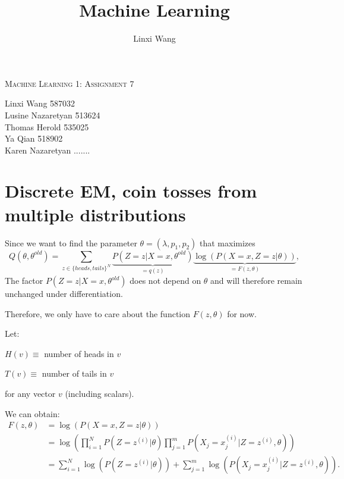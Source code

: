 \documentclass[10pt,a4paper]{article}
\author{Linxi Wang}
\title{Machine Learning}
\begin{document}
\begin{center}
\Large{\textsc{Machine Learning 1: Assignment 7}} \\
\end{center}

\begin{tabbing}
Linxi Wang \hspace{0.9cm}\= 587032\\
Lusine Nazaretyan \hspace{0.9cm}\= 513624\\
Thomas Herold \hspace{0.9cm}\= 535025\\ 
Ya Qian \hspace{0.9cm}\= 518902\\ 
Karen Nazaretyan\>  .......
\end{tabbing}


\section{Discrete EM, coin tosses from multiple distributions}

Since we want to find the parameter $\theta=(\lambda,p_1,p_2)$ that maximizes \begin{equation*}
Q(\theta,\theta^{old})=\sum_{z\in \{heads,tails\}^N}\underbrace{P(Z=z|X=x,\theta^{old})}_{=q(z)}  \underbrace{\log(P(X=x,Z=z|\theta))}_{=F(z,\theta)},
\end{equation*}
The factor $P(Z=z|X=x,\theta^{old})$ does not depend on $\theta$ and will therefore remain unchanged under differentiation.

Therefore, we only have to care about the function $F(z,\theta)$ for now.

Let: 

$H(v)\equiv$ number of heads in $v$

$T(v)\equiv$ number of tails in $v$
 
for any vector $v$ (including scalars).

We can obtain:
\begin{align*}
F(z,\theta)&=\log(P(X=x,Z=z|\theta))\\
&=\log( \prod_{i=1}^N P(Z=z^{(i)}|\theta) \prod_{j=1}^m P(X_j=x_j^{(i)}|Z=z^{(i)},\theta)) \\
&=\sum_{i=1}^N \log (P(Z=z^{(i)}|\theta)) + \sum_{j=1}^m \log (P(X_j=x_j^{(i)}|Z=z^{(i)},\theta)).
\end{align*}
\end{document}
